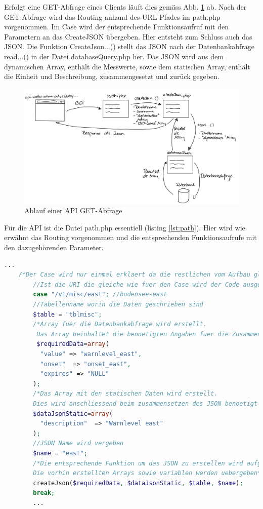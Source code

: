 Erfolgt eine GET-Abfrage eines Clients läuft dies gemäss Abb. \ref{img:APIFiles}  ab. Nach der GET-Abfrage wird das Routing anhand des URL Pfades im path.php vorgenommen. Im Case wird der entsprechende Funktionsaufruf mit den Parametern an das CreateJSON übergeben. Hier entsteht zum Schluss auch das JSON. Die Funktion CreateJson...() stellt das JSON nach der Datenbankabfrage read...() in der Datei databaseQuery.php her. Das JSON wird aus dem dynamischen Array, enthält die Messwerte, sowie dem statischen Array, enthält die Einheit und Beschreibung, zusammengesetzt und zurück gegeben. 
\begin{figure}[h!]
	\centering
	\includegraphics[width=0.5\linewidth]{img/API_GET.jpg}
	\caption{Ablauf einer API GET-Abfrage}
	\label{img:APIFiles}
\end{figure}

Für die API ist die Datei path.php essentiell (listing \ref{lst:path}). Hier wird wie erwähnt das Routing vorgenommen und die entsprechenden Funktionsaufrufe mit den dazugehörenden Parameter.  


\begin{lstlisting}[label=lst:path,caption=Beispiel Case zuweisung, language=php, style=php]
	...    
    /*Der Case wird nur einmal erklaert da die restlichen vom Aufbau gleich sind*/
        //Ist die URI die gleiche wie fuer den Case wird der Code ausgefuehrt
        case "/v1/misc/east"; //bodensee-east
        //Tabellenname worin die Daten geschrieben sind
        $table = "tblmisc";
        /*Array fuer die Datenbankabfrage wird erstellt.
         Das Array beinhaltet die benoetigten Angaben fuer die Zusammensetzung*/
         $requiredData=array(
          "value" => "warnlevel_east",
          "onset"  => "onset_east",
          "expires" => "NULL"
        );
        /*Das Array mit den statischen Daten wird erstellt.
        Dies wird anschliessend beim zusammensetzen des JSON benoetigt */
        $dataJsonStatic=array(
          "description"  => "Warnlevel east"
        );
        //JSON Name wird vergeben
        $name = "east";
        /*Die entsprechende Funktion um das JSON zu erstellen wird aufgerufen.
        Die vorhin erstellten Arrays sowie variablen werden uebergeben*/
        createJson($requiredData, $dataJsonStatic, $table, $name);
        break;
        ...
\end{lstlisting}

